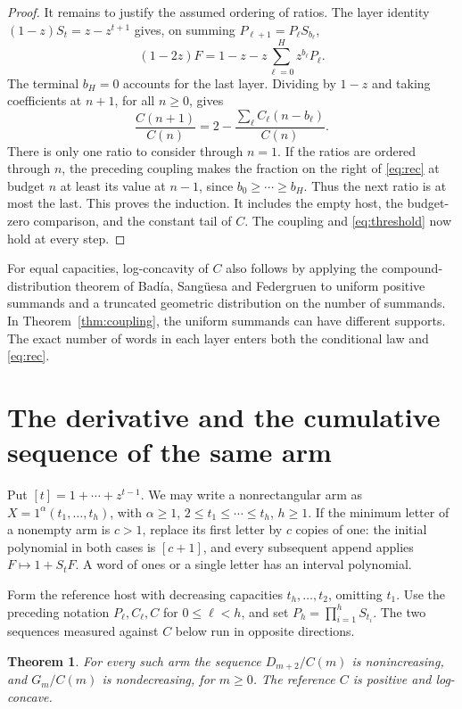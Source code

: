 \documentclass[11pt]{article}
\newtheorem{theorem}{Theorem}[section]
\begin{document}
\begin{proof}
It remains to justify the assumed ordering of ratios. The layer identity
\((1-z)S_t=z-z^{t+1}\) gives, on summing \(P_{\ell+1}=P_\ell S_{b_\ell}\),
\[
 (1-2z)F=1-z-z\sum_{\ell=0}^H z^{b_\ell}P_\ell .
\]
The terminal \(b_H=0\) accounts for the last layer. Dividing by \(1-z\)
and taking coefficients at \(n+1\), for all \(n\ge0\), gives
\begin{equation}
       \frac{C(n+1)}{C(n)}
            =2-\frac{\sum_\ell C_\ell(n-b_\ell)}{C(n)}.              \label{eq:rec}
\end{equation}
There is only one ratio to consider through \(n=1\). If the ratios
are ordered through \(n\), the preceding coupling makes the fraction
on the right of \eqref{eq:rec} at budget \(n\) at least its value at
\(n-1\), since \(b_0\ge\cdots\ge b_H\). Thus the next ratio is at
most the last. This proves the induction. It includes the empty host,
the budget-zero comparison, and the constant tail of \(C\). The
coupling and \eqref{eq:threshold} now hold at every step.
\end{proof}

For equal capacities, log-concavity of \(C\) also follows by applying
the compound-distribution theorem of Bad\'ia, Sang\"uesa and Federgruen
\cite{badia} to uniform positive summands and a truncated geometric
distribution on the number of summands. In Theorem~\ref{thm:coupling},
the uniform summands can have different supports. The exact number
of words in each layer enters both the conditional law and
\eqref{eq:rec}.

\section{The derivative and the cumulative sequence of the same arm}
Put \([t]=1+\cdots+z^{t-1}\). We may write a nonrectangular arm
as \(X=1^\alpha(t_1,\ldots,t_h)\), with \(\alpha\ge1\),
\(2\le t_1\le\cdots\le t_h\), \(h\ge1\). If the minimum letter of a
nonempty arm is \(c>1\), replace its first letter by \(c\) copies of one:
the initial polynomial in both cases is \([c+1]\), and every subsequent
append applies \(F\mapsto1+S_tF\). A word of ones or a single letter
has an interval polynomial.

Form the reference host with decreasing capacities \(t_h,\ldots,t_2\),
omitting \(t_1\). Use the preceding notation \(P_\ell,C_\ell,C\)
for \(0\le\ell<h\), and set \(P_h=\prod_{i=1}^h S_{t_i}\). The two
sequences measured against \(C\) below run in opposite directions.

\begin{theorem}\label{thm:sandwich}
For every such arm the sequence \(D_{m+2}/C(m)\) is nonincreasing,
and \(G_m/C(m)\) is nondecreasing, for \(m\ge0\). The reference
\(C\) is positive and log-concave.
\end{theorem}
\end{document}
